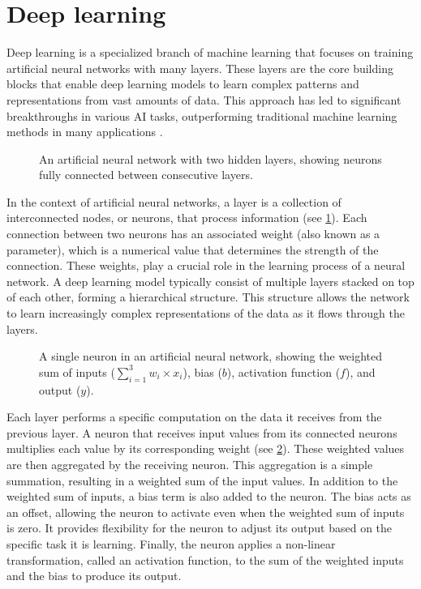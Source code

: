 \section{Deep learning}
Deep learning is a specialized branch of machine learning that focuses on training artificial neural networks with many layers.
These layers are the core building blocks that enable deep learning models to learn complex patterns and representations from vast amounts of data.
This approach has led to significant breakthroughs in various AI tasks, outperforming traditional machine learning methods in many applications \cite{lecunDeepLearning2015}.

\begin{figure}[hbtp]
    \centering    
    
    \caption{An artificial neural network with two hidden layers, showing neurons fully connected between consecutive layers.}
    \label{fig:ann}
\end{figure}

In the context of artificial neural networks, a layer is a collection of interconnected nodes, or neurons, that process information (see \cref{fig:ann}).
Each connection between two neurons has an associated weight (also known as a parameter), which is a numerical value that determines the strength of the connection.
These weights, play a crucial role in the learning process of a neural network.
A deep learning model typically consist of multiple layers stacked on top of each other, forming a hierarchical structure.
This structure allows the network to learn increasingly complex representations of the data as it flows through the layers.

\begin{figure}[hbtp]
    \centering    
    
    \caption{
        A single neuron in an artificial neural network, showing the weighted sum of inputs ($\sum_{i=1}^{3}{w_i \times x_i}$), bias ($b$), activation function ($f$), and output ($y$).
    }
    \label{fig:neuron}
\end{figure}

Each layer performs a specific computation on the data it receives from the previous layer.
A neuron that receives input values from its connected neurons multiplies each value by its corresponding weight (see \cref{fig:neuron}).
These weighted values are then aggregated by the receiving neuron.
This aggregation is a simple summation, resulting in a weighted sum of the input values.
In addition to the weighted sum of inputs, a bias term is also added to the neuron.
The bias acts as an offset, allowing the neuron to activate even when the weighted sum of inputs is zero.
It provides flexibility for the neuron to adjust its output based on the specific task it is learning.
Finally, the neuron applies a non-linear transformation, called an activation function, to the sum of the weighted inputs and the bias to produce its output.

